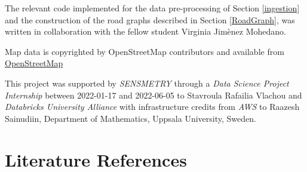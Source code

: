 \documentclass[12pt]{article}
\theoremstyle{definition}
\begin{document}
The relevant code implemented for the data pre-processing of Section \ref{ingestion} and the construction of the road graphs described in Section \ref{RoadGraph}, was written in collaboration with the fellow student Virginia Jim\`enez Mohedano. 

Map data is copyrighted by  OpenStreetMap contributors and available from \href{https://www.openstreetmap.org}{OpenStreetMap}

This project was supported by {\em SENSMETRY} through a {\em Data Science Project Internship} between 2022-01-17 and 2022-06-05 to Stavroula Rafailia Vlachou and {\em Databricks University Alliance} with infrastructure credits from {\em AWS} to Raazesh Sainudiin, Department of Mathematics, Uppsala University, Sweden.


\section{Literature References}


\end{document}
